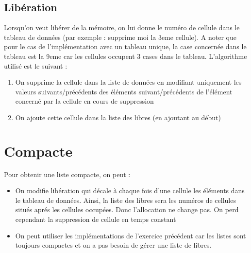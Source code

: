 \documentclass{report}
\begin{document}
      \subsection{Libération}
        Lorsqu'on veut libérer de la mémoire, on lui donne le numéro de cellule dans le tableau de données (par exemple : supprime moi la 3eme cellule). A noter que pour le cas de l'implémentation avec un tableau unique, la case concernée dans le tableau est la 9eme car les cellules occupent 3 cases dans le tableau.
        L'algorithme utilisé est le suivant :
        \begin{enumerate}
          \item On supprime la cellule dans la liste de données en modifiant uniquement les valeurs suivants/précédents des éléments suivant/précédents de l'élément concerné par la cellule en cours de suppression
          \item On ajoute cette cellule dans la liste des libres (en ajoutant au début)
        \end{enumerate}
    \section{Compacte}
      Pour obtenir une liste compacte, on peut :
      \begin{itemize}
        \item On modifie libération qui décale à chaque fois d'une cellule les éléments dans le tableau de données. Ainsi, la liste des libres sera les numéros de cellules situés aprés les cellules occupées. Donc l'allocation ne change pas. On perd cependant la suppression de cellule en temps constant
        \item On peut utiliser les implémentations de l'exercice précédent car les listes sont toujours compactes et on a pas besoin de gérer une liste de libres.
      \end{itemize}
\end{document}

